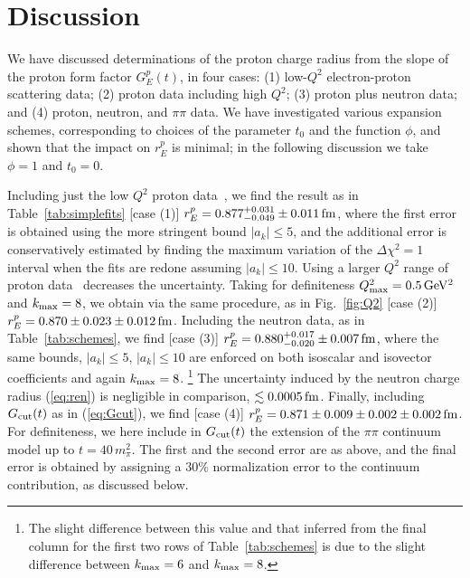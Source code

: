 \documentclass[12pt]{article}
\begin{document}
\section{Discussion \label{sec:discussion}} 

We have discussed determinations of the proton charge radius from 
the slope of the proton form factor $G_E^p(t)$, in four cases: 
(1) low-$Q^2$ electron-proton scattering data;  
(2) proton data including high $Q^2$; 
(3) proton plus neutron data; and (4) proton, neutron, and $\pi\pi$ data.  
We have investigated various expansion schemes, corresponding to choices of the parameter $t_0$ and
the function $\phi$, and shown that the impact on $r_E^p$ is minimal; in the following discussion we 
take $\phi=1$ and $t_0=0$. 

Including just the low $Q^2$ proton data~\cite{Rosenfelder:1999cd}, 
we find the result as in Table~\ref{tab:simplefits} [case (1)] 
$r_E^p = 0.877^{+0.031}_{-0.049} \pm 0.011 \,{\rm fm}$, where the first error 
is obtained using the more stringent bound $|a_k|\le 5$, and the additional error
is conservatively estimated by finding the maximum variation of the $\Delta \chi^2=1$ interval
when the fits are redone assuming $|a_k|\le 10$.   
Using a larger $Q^2$ range of proton data~\cite{Arrington:2007ux} decreases the uncertainty. 
Taking for definiteness $Q^2_{\rm max}=0.5\,{\rm GeV^2}$ and $k_{\rm max}=8$,  
we obtain via the same procedure, as in Fig.~\ref{fig:Q2} 
 [case (2)]
$r_E^p = 0.870 \pm 0.023 \pm 0.012\,{\rm fm}$. 
Including the neutron data, as in Table~\ref{tab:schemes}, we find  [case (3)] 
$r_E^p = 0.880^{+0.017}_{-0.020} \pm 0.007\,{\rm fm}$, where the same bounds, 
$|a_k|\le 5$, $|a_k|\le 10$ are enforced on both isoscalar and isovector coefficients and again $k_{\rm max}=8$.%
%
\footnote{
The slight difference between this value and that inferred from the final column for 
the first two rows of Table~\ref{tab:schemes} 
is due to the slight difference between $k_{\rm max}=6$ and $k_{\rm max}=8$.
}
% 
The uncertainty induced by the 
neutron charge radius (\ref{eq:ren}) is negligible in comparison, $\lesssim 0.0005\,{\rm fm}$. 
Finally, including $G_{\rm cut}(t)$ as in (\ref{eq:Gcut}), we find [case (4)]
$r_E^p = 0.871 \pm 0.009 \pm 0.002 \pm 0.002 \,{\rm fm}$. 
For definiteness, we here include in $G_{\rm cut}(t)$ the extension of the 
$\pi\pi$ continuum model up to $t=40\,m_\pi^2$.  The first and the second error 
are as above, and the final error is obtained by assigning a $30\%$ normalization error 
to the continuum contribution, as discussed below.  
\end{document}
